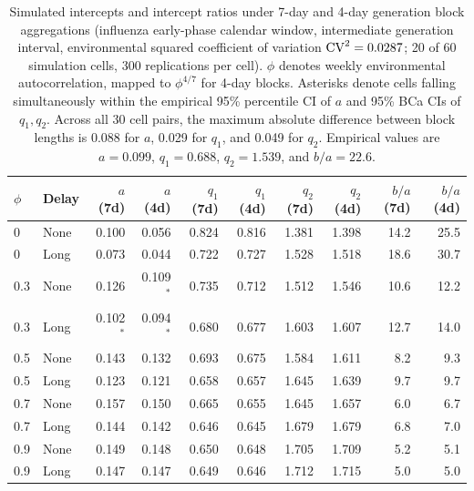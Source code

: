 \begin{table}[!htbp]
  \centering
  \caption{Simulated intercepts and intercept ratios under 7-day and 4-day generation block aggregations (influenza early-phase calendar window, intermediate generation interval, environmental squared coefficient of variation $\mathrm{CV}^2 = 0.0287$; 20 of 60 simulation cells, 300 replications per cell). $\phi$ denotes weekly environmental autocorrelation, mapped to $\phi^{4/7}$ for 4-day blocks. Asterisks denote cells falling simultaneously within the empirical 95\% percentile CI of $a$ and 95\% BCa CIs of $q_1, q_2$. Across all 30 cell pairs, the maximum absolute difference between block lengths is 0.088 for $a$, 0.029 for $q_1$, and 0.049 for $q_2$. Empirical values are $a = 0.099$, $q_1 = 0.688$, $q_2 = 1.539$, and $b/a = 22.6$.}
  \label{tab:s-twogen}
  \small
  \begin{tabular}{@{}llrrrrrrrr@{}}
    \toprule
    $\phi$ & Delay & $a$ (7d) & $a$ (4d) & $q_1$ (7d) & $q_1$ (4d) & $q_2$ (7d) & $q_2$ (4d) & $b/a$ (7d) & $b/a$ (4d) \\
    \midrule
    0 & None & 0.100 & 0.056 & 0.824 & 0.816 & 1.381 & 1.398 & 14.2 & 25.5 \\
    0 & Long & 0.073 & 0.044 & 0.722 & 0.727 & 1.528 & 1.518 & 18.6 & 30.7 \\
    0.3 & None & 0.126 & 0.109$^{*}$ & 0.735 & 0.712 & 1.512 & 1.546 & 10.6 & 12.2 \\
    0.3 & Long & 0.102$^{*}$ & 0.094$^{*}$ & 0.680 & 0.677 & 1.603 & 1.607 & 12.7 & 14.0 \\
    0.5 & None & 0.143 & 0.132 & 0.693 & 0.675 & 1.584 & 1.611 & 8.2 & 9.3 \\
    0.5 & Long & 0.123 & 0.121 & 0.658 & 0.657 & 1.645 & 1.639 & 9.7 & 9.7 \\
    0.7 & None & 0.157 & 0.150 & 0.665 & 0.655 & 1.645 & 1.657 & 6.0 & 6.7 \\
    0.7 & Long & 0.144 & 0.142 & 0.646 & 0.645 & 1.679 & 1.679 & 6.8 & 7.0 \\
    0.9 & None & 0.149 & 0.148 & 0.650 & 0.648 & 1.705 & 1.709 & 5.2 & 5.1 \\
    0.9 & Long & 0.147 & 0.147 & 0.649 & 0.646 & 1.712 & 1.715 & 5.0 & 5.0 \\
    \bottomrule
  \end{tabular}
\end{table}
